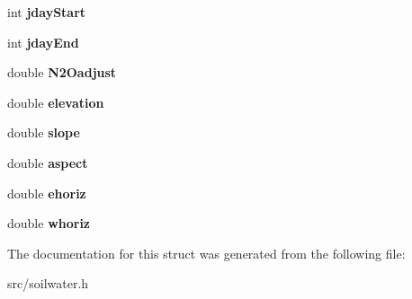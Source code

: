 \begin{DoxyCompactItemize}
\item 
\hypertarget{struct_s_i_t_e_p_a_r___s_a89c153501774eba5cfa5ceddf33bf706}{int {\bfseries jday\-Start}}\label{struct_s_i_t_e_p_a_r___s_a89c153501774eba5cfa5ceddf33bf706}

\item 
\hypertarget{struct_s_i_t_e_p_a_r___s_a5f631a2199ad24c85dbc481dc06c9a59}{int {\bfseries jday\-End}}\label{struct_s_i_t_e_p_a_r___s_a5f631a2199ad24c85dbc481dc06c9a59}

\item 
\hypertarget{struct_s_i_t_e_p_a_r___s_a891926a037c8596d181a042a98823b69}{double {\bfseries N2\-Oadjust}}\label{struct_s_i_t_e_p_a_r___s_a891926a037c8596d181a042a98823b69}

\item 
\hypertarget{struct_s_i_t_e_p_a_r___s_a55a8d0d3c0e59011f31fb317cd7a48ca}{double {\bfseries elevation}}\label{struct_s_i_t_e_p_a_r___s_a55a8d0d3c0e59011f31fb317cd7a48ca}

\item 
\hypertarget{struct_s_i_t_e_p_a_r___s_aa585ddd915bb8075c96631a7ead70907}{double {\bfseries slope}}\label{struct_s_i_t_e_p_a_r___s_aa585ddd915bb8075c96631a7ead70907}

\item 
\hypertarget{struct_s_i_t_e_p_a_r___s_a720727af7380973fa99f0e6e7370f29c}{double {\bfseries aspect}}\label{struct_s_i_t_e_p_a_r___s_a720727af7380973fa99f0e6e7370f29c}

\item 
\hypertarget{struct_s_i_t_e_p_a_r___s_a6822220d1ea2b88fdff72f31e442bbfa}{double {\bfseries ehoriz}}\label{struct_s_i_t_e_p_a_r___s_a6822220d1ea2b88fdff72f31e442bbfa}

\item 
\hypertarget{struct_s_i_t_e_p_a_r___s_a6c4c3079ab0296a483059479b6c576b0}{double {\bfseries whoriz}}\label{struct_s_i_t_e_p_a_r___s_a6c4c3079ab0296a483059479b6c576b0}

\end{DoxyCompactItemize}


The documentation for this struct was generated from the following file\-:\begin{DoxyCompactItemize}
\item 
src/soilwater.\-h\end{DoxyCompactItemize}
